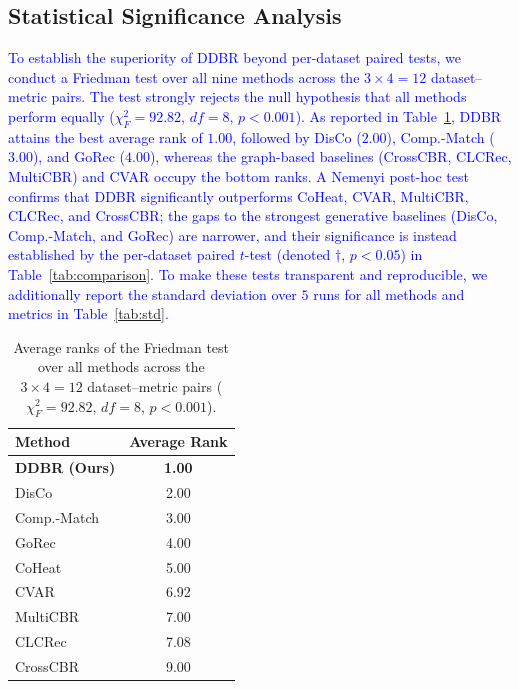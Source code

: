 \documentclass[lettersize,journal]{IEEEtran}
\newcommand{\revise}[1]{\textcolor{blue}{#1}}
\begin{document}
\subsection{Statistical Significance Analysis}
\label{sec:stat_sig}
\revise{To establish the superiority of DDBR beyond per-dataset paired tests, we conduct a Friedman test over all nine methods across the $3\times4=12$ dataset--metric pairs. The test strongly rejects the null hypothesis that all methods perform equally ($\chi^2_F=92.82$, $df=8$, $p<0.001$). As reported in Table~\ref{tab:friedman}, DDBR attains the best average rank of $1.00$, followed by DisCo ($2.00$), Comp.-Match ($3.00$), and GoRec ($4.00$), whereas the graph-based baselines (CrossCBR, CLCRec, MultiCBR) and CVAR occupy the bottom ranks. A Nemenyi post-hoc test confirms that DDBR significantly outperforms CoHeat, CVAR, MultiCBR, CLCRec, and CrossCBR; the gaps to the strongest generative baselines (DisCo, Comp.-Match, and GoRec) are narrower, and their significance is instead established by the per-dataset paired $t$-test (denoted $\dagger$, $p<0.05$) in Table~\ref{tab:comparison}. To make these tests transparent and reproducible, we additionally report the standard deviation over $5$ runs for all methods and metrics in Table~\ref{tab:std}.}

\begin{table}[htbp]
\caption{Average ranks of the Friedman test over all methods across the $3\times4=12$ dataset--metric pairs ($\chi^2_F=92.82$, $df=8$, $p<0.001$).}
\label{tab:friedman}
\centering
\begin{tabular}{lc}
\toprule
\textbf{Method} & \textbf{Average Rank} \\
\midrule
\textbf{DDBR (Ours)} & \textbf{1.00} \\
DisCo       & 2.00 \\
Comp.-Match & 3.00 \\
GoRec       & 4.00 \\
CoHeat      & 5.00 \\
CVAR        & 6.92 \\
MultiCBR    & 7.00 \\
CLCRec      & 7.08 \\
CrossCBR    & 9.00 \\
\bottomrule
\end{tabular}
\end{table}
\end{document}
